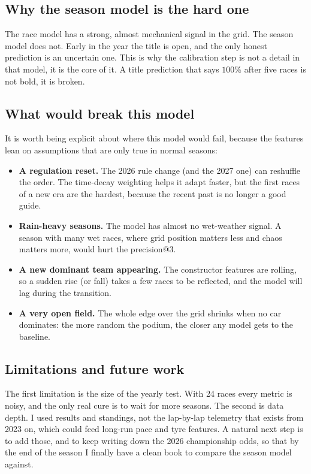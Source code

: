 \documentclass[10pt,twocolumn]{article}
\begin{document}
\subsection{Why the season model is the hard one}
The race model has a strong, almost mechanical signal in the grid. The season
model does not. Early in the year the title is open, and the only honest
prediction is an uncertain one. This is why the calibration step is not a detail
in that model, it is the core of it. A title prediction that says \(100\%\)
after five races is not bold, it is broken.

\subsection{What would break this model}
It is worth being explicit about where this model would fail, because the
features lean on assumptions that are only true in normal seasons:
\begin{itemize}[leftmargin=1.2em,itemsep=2pt]
  \item \textbf{A regulation reset.} The 2026 rule change (and the 2027 one) can
        reshuffle the order. The time-decay weighting helps it adapt faster, but
        the first races of a new era are the hardest, because the recent past is
        no longer a good guide.
  \item \textbf{Rain-heavy seasons.} The model has almost no wet-weather signal.
        A season with many wet races, where grid position matters less and chaos
        matters more, would hurt the precision@3.
  \item \textbf{A new dominant team appearing.} The constructor features are
        rolling, so a sudden rise (or fall) takes a few races to be reflected,
        and the model will lag during the transition.
  \item \textbf{A very open field.} The whole edge over the grid shrinks when no
        car dominates: the more random the podium, the closer any model gets to
        the baseline.
\end{itemize}

\subsection{Limitations and future work}
The first limitation is the size of the yearly test. With 24 races every metric
is noisy, and the only real cure is to wait for more seasons. The second is data
depth. I used results and standings, not the lap-by-lap telemetry that exists
from 2023 on, which could feed long-run pace and tyre features. A natural next
step is to add those, and to keep writing down the 2026 championship odds, so
that by the end of the season I finally have a clean book to compare the season
model against.
\end{document}
